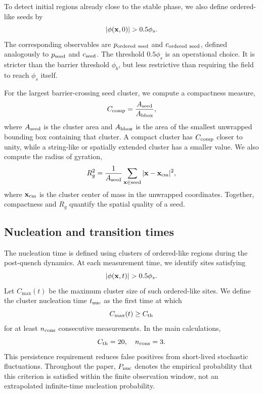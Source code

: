 ﻿\documentclass[aps,pre,preprint,showkeys,amsmath,amssymb,superscriptaddress,longbibliography]{revtex4-2}
\begin{document}
To detect initial regions already close to the stable phase, we also define ordered-like seeds by
\begin{equation}
|\phi({\bf x},0)|>0.5\phi_s.
\end{equation}
The corresponding observables are $p_{\rm ordered\ seed}$ and $c_{\rm ordered\ seed}$, defined analogously to $p_{\rm seed}$ and $c_{\rm seed}$. The threshold $0.5\phi_s$ is an operational choice. It is stricter than the barrier threshold $\phi_b$, but less restrictive than requiring the field to reach $\phi_s$ itself.

For the largest barrier-crossing seed cluster, we compute a compactness measure,
\begin{equation}
C_{\rm comp}=\frac{A_{\rm seed}}{A_{\rm bbox}},
\end{equation}
where $A_{\rm seed}$ is the cluster area and $A_{\rm bbox}$ is the area of the smallest unwrapped bounding box containing that cluster. A compact cluster has $C_{\rm comp}$ closer to unity, while a string-like or spatially extended cluster has a smaller value. We also compute the radius of gyration,
\begin{equation}
R_g^2=\frac{1}{A_{\rm seed}}\sum_{{\bf x}\in {\rm seed}}|{\bf x}-{\bf x}_{\rm cm}|^2,
\end{equation}
where ${\bf x}_{\rm cm}$ is the cluster center of mass in the unwrapped coordinates. Together, compactness and $R_g$ quantify the spatial quality of a seed.

\subsection{Nucleation and transition times}\label{nucleation-and-transition-times}

The nucleation time is defined using clusters of ordered-like regions during the post-quench dynamics. At each measurement time, we identify sites satisfying
\begin{equation}
|\phi({\bf x},t)|>0.5\phi_s.
\end{equation}
Let $C_{\max}(t)$ be the maximum cluster size of such ordered-like sites. We define the cluster nucleation time $t_{\rm nuc}$ as the first time at which
\begin{equation}
C_{\max}(t)\ge C_{\rm th}
\end{equation}
for at least $n_{\rm cons}$ consecutive measurements. In the main calculations,
\begin{equation}
C_{\rm th}=20,\quad n_{\rm cons}=3.
\end{equation}
This persistence requirement reduces false positives from short-lived stochastic fluctuations. Throughout the paper, $P_{\rm nuc}$ denotes the empirical probability that this criterion is satisfied within the finite observation window, not an extrapolated infinite-time nucleation probability.
\end{document}
